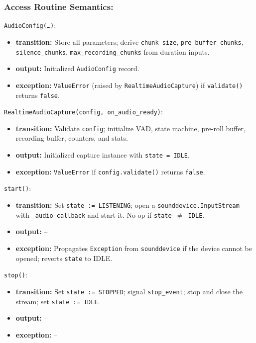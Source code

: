 \documentclass[12pt, titlepage]{article}
\begin{document}
\subsubsection{Access Routine Semantics:}

\noindent\texttt{AudioConfig(\ldots)}:
\begin{itemize}
  \item \textbf{transition:} Store all parameters; derive \texttt{chunk\_size}, \texttt{pre\_buffer\_chunks}, \texttt{silence\_chunks}, \texttt{max\_recording\_chunks} from duration inputs.
  \item \textbf{output:} Initialized \texttt{AudioConfig} record.
  \item \textbf{exception:} \texttt{ValueError} (raised by \texttt{RealtimeAudioCapture}) if \texttt{validate()} returns \texttt{false}.
\end{itemize}

\noindent\texttt{RealtimeAudioCapture(config, on\_audio\_ready)}:
\begin{itemize}
  \item \textbf{transition:} Validate \texttt{config}; initialize VAD, state machine, pre-roll buffer, recording buffer, counters, and stats.
  \item \textbf{output:} Initialized capture instance with \texttt{state = IDLE}.
  \item \textbf{exception:} \texttt{ValueError} if \texttt{config.validate()} returns \texttt{false}.
\end{itemize}

\noindent\texttt{start()}:
\begin{itemize}
  \item \textbf{transition:} Set \texttt{state := LISTENING}; open a \texttt{sounddevice.InputStream} with \texttt{\_audio\_callback} and start it. No-op if \texttt{state $\neq$ IDLE}.
  \item \textbf{output:} --
  \item \textbf{exception:} Propagates \texttt{Exception} from \texttt{sounddevice} if the device cannot be opened; reverts \texttt{state} to IDLE.
\end{itemize}

\noindent\texttt{stop()}:
\begin{itemize}
  \item \textbf{transition:} Set \texttt{state := STOPPED}; signal \texttt{stop\_event}; stop and close the stream; set \texttt{state := IDLE}.
  \item \textbf{output:} --
  \item \textbf{exception:} --
\end{itemize}
\end{document}
